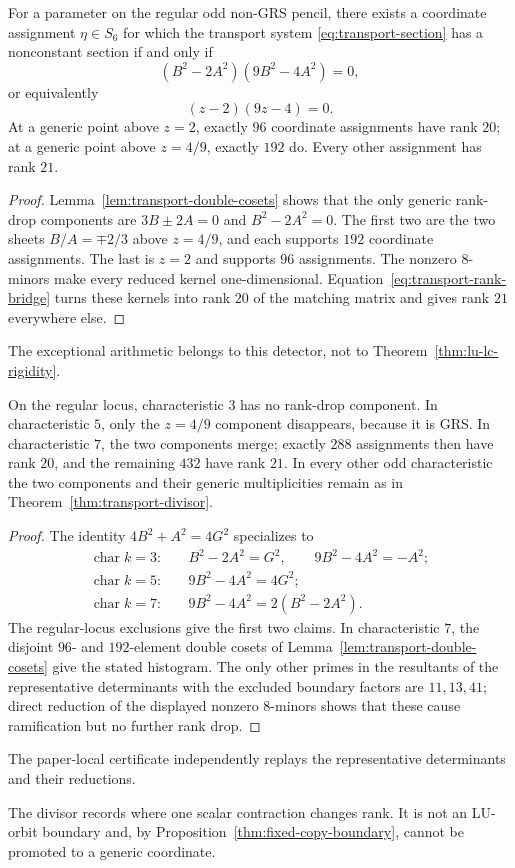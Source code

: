 \begin{theorem}\label{thm:transport-divisor}
For a parameter on the regular odd non-GRS pencil, there exists a coordinate
assignment \(\eta\in S_6\) for which the transport system
\eqref{eq:transport-section} has a nonconstant
section if and only if
\[
 (B^2-2A^2)(9B^2-4A^2)=0,
\]
or equivalently
\begin{equation}\label{eq:transport-divisor}
 (z-2)(9z-4)=0.
\end{equation}
At a generic point above \(z=2\), exactly \(96\) coordinate assignments have
rank \(20\); at a generic point above \(z=4/9\), exactly \(192\) do.
Every other assignment has rank \(21\).
\end{theorem}

\begin{proof}
Lemma~\ref{lem:transport-double-cosets} shows that the only generic rank-drop
components are \(3B\pm2A=0\) and \(B^2-2A^2=0\).  The first two are the two
sheets \(B/A=\mp2/3\) above \(z=4/9\), and each supports \(192\) coordinate
assignments.  The last is \(z=2\) and supports \(96\) assignments.  The
nonzero \(8\)-minors make every reduced kernel one-dimensional.
Equation~\eqref{eq:transport-rank-bridge} turns these kernels into rank
\(20\) of the matching matrix and gives rank \(21\) everywhere else.
\end{proof}

The exceptional arithmetic belongs to this detector, not to
Theorem~\ref{thm:lu-lc-rigidity}.

\begin{corollary}\label{cor:transport-characteristics}
On the regular locus, characteristic \(3\) has no rank-drop component.  In
characteristic \(5\), only the \(z=4/9\) component disappears, because it is
GRS.  In characteristic \(7\), the two components merge; exactly \(288\)
assignments then have rank \(20\), and the remaining \(432\) have rank
\(21\).  In every other odd characteristic the two components and their
generic multiplicities remain as in Theorem~\ref{thm:transport-divisor}.
\end{corollary}

\begin{proof}
The identity \(4B^2+A^2=4G^2\) specializes to
\[
\begin{aligned}
\operatorname{char}k=3:&\quad
B^2-2A^2=G^2,\qquad 9B^2-4A^2=-A^2;\\
\operatorname{char}k=5:&\quad 9B^2-4A^2=4G^2;\\
\operatorname{char}k=7:&\quad
9B^2-4A^2=2(B^2-2A^2).
\end{aligned}
\]
The regular-locus exclusions give the first two claims.  In characteristic
\(7\), the disjoint \(96\)- and \(192\)-element double cosets of
Lemma~\ref{lem:transport-double-cosets} give the stated histogram.  The only
other primes in the resultants of the representative determinants with the
excluded boundary factors are \(11,13,41\); direct reduction of the displayed
nonzero \(8\)-minors shows that these cause ramification but no further rank
drop.
\end{proof}

The paper-local certificate independently replays the representative
determinants and their reductions.

The divisor records where one scalar contraction changes rank.  It is
not an LU-orbit boundary and, by
Proposition~\ref{thm:fixed-copy-boundary}, cannot be promoted to a
generic coordinate.
